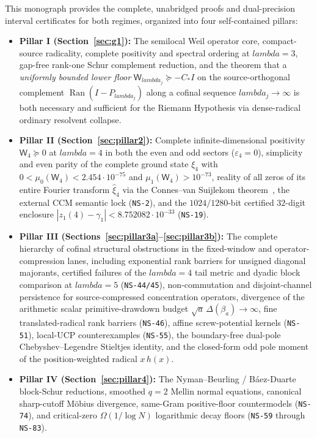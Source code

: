 \documentclass[11pt]{article}
\def\lambda{lambda}%
\theoremstyle{remark}
\begin{document}
This monograph provides the complete, unabridged proofs and dual-precision interval certificates for both regimes, organized into four self-contained pillars:
\begin{itemize}
\item \textbf{Pillar I (Section~\ref{sec:g1}):} The semilocal Weil operator core, compact-source radicality, complete positivity and spectral ordering at $\lambda=3$, gap-free rank-one Schur complement reduction, and the theorem that a \emph{uniformly bounded lower floor} $\mathsf W_{\lambda_j}\succeq -C_* I$ on the source-orthogonal complement $\operatorname{Ran}(I-P_{\lambda_j})$ along a cofinal sequence $\lambda_j\to\infty$ is both necessary and sufficient for the Riemann Hypothesis via dense-radical ordinary resolvent collapse.
\item \textbf{Pillar II (Section~\ref{sec:pillar2}):} Complete infinite-dimensional positivity $\mathsf W_4\succeq 0$ at $\lambda=4$ in both the even and odd sectors ($\varepsilon_4=0$), simplicity and even parity of the complete ground state $\xi_4$ with $0<\mu_0(\mathsf W_4)<2.454\cdot 10^{-75}$ and $\mu_1(\mathsf W_4)>10^{-73}$, reality of all zeros of its entire Fourier transform $\widehat{\xi}_4$ via the Connes--van Suijlekom theorem~\cite{ConnesVanSuijlekom2025}, the external CCM semantic lock (\texttt{NS-2}), and the $1024/1280$-bit certified $32$-digit enclosure $|z_1(4)-\gamma_1|<8.752082\cdot 10^{-33}$ (\texttt{NS-19}).
\item \textbf{Pillar III (Sections~\ref{sec:pillar3a}--\ref{sec:pillar3b}):} The complete hierarchy of cofinal structural obstructions in the fixed-window and operator-compression lanes, including exponential rank barriers for unsigned diagonal majorants, certified failures of the $\lambda=4$ tail metric and dyadic block comparison at $\lambda=5$ (\texttt{NS-44/45}), non-commutation and disjoint-channel persistence for source-compressed concentration operators, divergence of the arithmetic scalar primitive-drawdown budget $\sqrt{a}\,\Delta(\beta_a)\to\infty$, fine translated-radical rank barriers (\texttt{NS-46}), affine screw-potential kernels (\texttt{NS-51}), local-UCP counterexamples (\texttt{NS-55}), the boundary-free dual-pole Chebyshev--Legendre Stieltjes identity, and the closed-form odd pole moment of the position-weighted radical $x\,h(x)$.
\item \textbf{Pillar IV (Section~\ref{sec:pillar4}):} The Nyman--Beurling / B\'aez-Duarte block-Schur reductions, smoothed $q=2$ Mellin normal equations, canonical sharp-cutoff M\"obius divergence, same-Gram positive-floor countermodels (\texttt{NS-74}), and critical-zero $\Omega(1/\log N)$ logarithmic decay floors (\texttt{NS-59} through \texttt{NS-83}).
\end{itemize}
\end{document}
